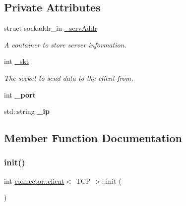 \subsection*{Private Attributes}
\begin{DoxyCompactItemize}
\item 
struct sockaddr\+\_\+in \hyperlink{classconnector_1_1client_3_01TCP_01_4_af68017a9141be44f9722c6958c6424fc}{\+\_\+serv\+Addr}
\begin{DoxyCompactList}\small\item\em A container to store server information. \end{DoxyCompactList}\item 
\mbox{\label{classconnector_1_1client_3_01TCP_01_4_a7dfa650dcfcd1a0a313404133c71ecbc}} 
int \hyperlink{classconnector_1_1client_3_01TCP_01_4_a7dfa650dcfcd1a0a313404133c71ecbc}{\+\_\+skt}
\begin{DoxyCompactList}\small\item\em The socket to send data to the client from. \end{DoxyCompactList}\item 
\mbox{\label{classconnector_1_1client_3_01TCP_01_4_ae684172f0c1a61182e91939bf289e5d3}} 
int {\bfseries \+\_\+port}
\item 
\mbox{\label{classconnector_1_1client_3_01TCP_01_4_aabb486122e41c645c35e91569daece36}} 
std\+::string {\bfseries \+\_\+ip}
\end{DoxyCompactItemize}


\subsection{Member Function Documentation}
\mbox{\label{classconnector_1_1client_3_01TCP_01_4_a9bca6347bbf5732e8974e69dc16d60e4}} 
\subsubsection{\texorpdfstring{init()}{init()}}
{\footnotesize\ttfamily int \hyperlink{classconnector_1_1client}{connector\+::client}$<$ T\+CP $>$\+::init (\begin{DoxyParamCaption}{ }\end{DoxyParamCaption})\hspace{0.3cm}{\ttfamily [inline]}}

